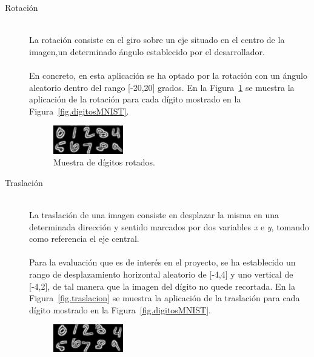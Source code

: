 \begin{description}
	\item[Rotación] \hfill 
	\vspace{5pt}
	\\
	La rotación consiste en el giro sobre un eje situado en el centro de la imagen,un determinado ángulo establecido por el desarrollador.\\
	\vspace{-10pt}
	\\
	En concreto, en esta aplicación se ha optado por la rotación con un ángulo aleatorio dentro del rango [-20,20] grados. En la Figura~\ref{fig.rotacion} se muestra la aplicación de la rotación para cada dígito mostrado en la Figura~\ref{fig.digitosMNIST}.
	
	\begin{figure}[H]
		\begin{center}
			\includegraphics[width=0.3\textwidth]{figures/rotacion}
			\caption{Muestra de dígitos rotados.}
			\label{fig.rotacion}
		\end{center}
	\end{figure}
	\vspace{-10pt}
	\item[Traslación] \hfill 
	\vspace{5pt}
	\\
	La traslación de una imagen consiste en desplazar la misma en una determinada dirección y sentido marcados por dos variables \textit{x} e \textit{y}, tomando como referencia el eje central.\\
	\vspace{-10pt}
	\\
	Para la evaluación que es de interés en el proyecto, se ha establecido un rango de desplazamiento horizontal aleatorio de [-4,4] y uno vertical de [-4,2], de tal manera que la imagen del dígito no quede recortada. En la Figura~\ref{fig.traslacion} se muestra la aplicación de la traslación para cada dígito mostrado en la Figura~\ref{fig.digitosMNIST}.
	\begin{figure}[H]
		\begin{center}
			\includegraphics[width=0.3\textwidth]{figures/traslacion}

\end{center}
\end{figure}
\end{description}
